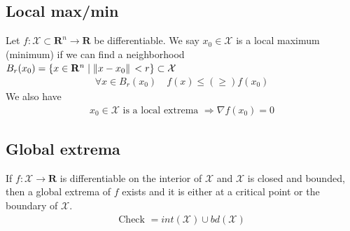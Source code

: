 \documentclass[8pt]{extarticle}
\newcommand{\R}{{\mathbb R}}
\newcommand{\X}{{\mathcal X}}
\newcommand{\ra}{{\rightarrow}}
\newcommand{\Ra}{{\Rightarrow}}
\def\R{\mathbf{R}}
\begin{document}
\begin{multicols*}{3}
  \subsection{Local max/min}
  Let $f: \X \subset \R^n \ra \R$ be differentiable. We say $x_0 \in \X$
  is a local maximum (minimum) if we can find a neighborhood
  $B_r(x_0) = \{ x \in \R^n\;|\; \norm*{x - x_0} < r \} \subset \X$
  \begin{align*}
    \forall x \in B_r(x_0) \quad f(x) \leq (\geq) f(x_0)
  \end{align*}
  We also have
  \begin{align*}
    x_0 \in \X \text{ is a local extrema } \Ra \nabla f(x_0) = 0
  \end{align*}
  \subsection{Global extrema}
  If $f: \X \ra \R$ is differentiable on the interior
  of $\X$ and $\X$ is closed and bounded, then a global
  extrema of $f$ exists and it is either at a critical point
  or the boundary of $\X$.
  \begin{align*}
    \text{Check } = int(\X) \cup bd(\X)
  \end{align*}

\end{multicols*}
\end{document}
